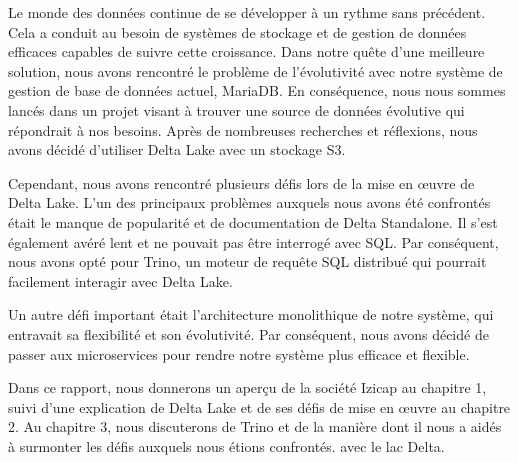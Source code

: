 \introduction
Le monde des données continue de se développer à un rythme sans précédent. Cela a conduit au besoin de systèmes de stockage et de gestion de données efficaces capables de suivre cette croissance. Dans notre quête d'une meilleure solution, nous avons rencontré le problème de l'évolutivité avec notre système de gestion de base de données actuel, MariaDB. En conséquence, nous nous sommes lancés dans un projet visant à trouver une source de données évolutive qui répondrait à nos besoins. Après de nombreuses recherches et réflexions, nous avons décidé d'utiliser Delta Lake avec un stockage S3.

Cependant, nous avons rencontré plusieurs défis lors de la mise en œuvre de Delta Lake. L'un des principaux problèmes auxquels nous avons été confrontés était le manque de popularité et de documentation de Delta Standalone. Il s'est également avéré lent et ne pouvait pas être interrogé avec SQL. Par conséquent, nous avons opté pour Trino, un moteur de requête SQL distribué qui pourrait facilement interagir avec Delta Lake.

Un autre défi important était l'architecture monolithique de notre système, qui entravait sa flexibilité et son évolutivité. Par conséquent, nous avons décidé de passer aux microservices pour rendre notre système plus efficace et flexible.

Dans ce rapport, nous donnerons un aperçu de la société Izicap au chapitre 1, suivi d'une explication de Delta Lake et de ses défis de mise en œuvre au chapitre 2. Au chapitre 3, nous discuterons de Trino et de la manière dont il nous a aidés à surmonter les défis auxquels nous étions confrontés. avec le lac Delta.